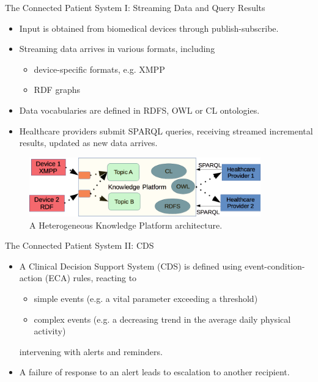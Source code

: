 \documentclass{beamer}
\begin{document}
\begin{frame}{The Connected Patient System I: Streaming Data and Query Results}
  \begin{itemize}
  \item {Input is obtained from biomedical devices through publish-subscribe.
  }
  \item {Streaming data arrives in various formats, including
     \begin{itemize}
     \item device-specific formats, e.g. XMPP
     \item RDF graphs
     \end{itemize}
  }
  \item Data vocabularies are defined in RDFS, OWL or CL ontologies.
  \item Healthcare providers submit SPARQL queries, receiving streamed incremental results, updated as new data arrives.
  \end{itemize}
  \begin{figure}[ht!]
\centering
\includegraphics[width=100mm]{diagrams/ConnectedPatient1.png}
\caption{A Heterogeneous Knowledge Platform architecture.}
\end{figure}  
\end{frame}
  
  
\begin{frame}{The Connected Patient System II: CDS}
  \begin{itemize}
  \item A Clinical Decision Support System (CDS) is defined using event-condition-action (ECA) rules, reacting to
     \begin{itemize}
     \item simple events (e.g. a vital parameter exceeding a threshold)
     \item complex events (e.g. a decreasing trend in the average daily physical activity)
     \end{itemize}
     intervening with alerts and reminders.
  \item A failure of response to an alert leads to escalation to another recipient.
  \end{itemize}
\end{frame}
  
\end{document}
